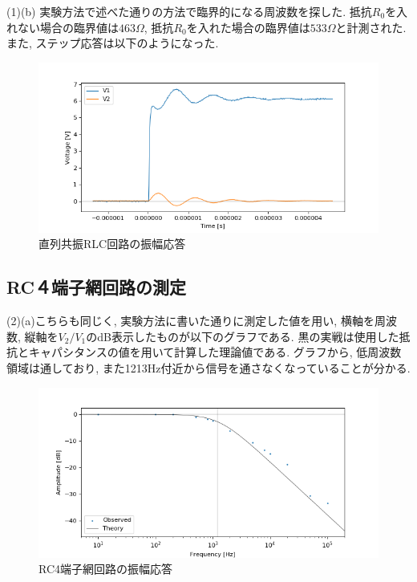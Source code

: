 \documentclass[a4j,dvipdfmx]{article}
\begin{document}
(1)(b) 実験方法で述べた通りの方法で臨界的になる周波数を探した. 抵抗$R_0$を入れない場合の臨界値は$463\Omega$, 抵抗$R_0$を入れた場合の臨界値は$533\Omega$と計測された. また, ステップ応答は以下のようになった. 
\begin{figure}[H]
    \begin{center}
     	\includegraphics[width=12cm]{figures/1b.png}
        \caption{直列共振RLC回路の振幅応答}
    \end{center}
\end{figure}

\subsection{RC４端子網回路の測定}
(2)(a)こちらも同じく, 実験方法に書いた通りに測定した値を用い, 横軸を周波数, 縦軸を$V_2/V_1$のdB表示したものが以下のグラフである. 黒の実戦は使用した抵抗とキャパシタンスの値を用いて計算した理論値である. グラフから, 低周波数領域は通しており, また1213Hz付近から信号を通さなくなっていることが分かる. 


\begin{figure}[H]
    \begin{center}
     	\includegraphics[width=12cm]{figures/four_terminal_RC_amp.png}
        \caption{RC4端子網回路の振幅応答}
    \end{center}
\end{figure}
\end{document}
